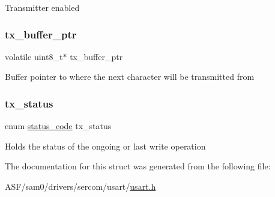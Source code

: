 Transmitter enabled \mbox{\label{structusart__module_ad4f5e977169e703291bab5e3483ff5dd}} 
\subsubsection{\texorpdfstring{tx\_buffer\_ptr}{tx\_buffer\_ptr}}
{\footnotesize\ttfamily volatile uint8\+\_\+t$\ast$ tx\+\_\+buffer\+\_\+ptr}

Buffer pointer to where the next character will be transmitted from \mbox{\label{structusart__module_af379c1d4517e118aa4b38c987c7f6d1e}} 
\subsubsection{\texorpdfstring{tx\_status}{tx\_status}}
{\footnotesize\ttfamily enum \mbox{\hyperlink{group__group__sam0__utils__status__codes_ga751c892e5a46b8e7d282085a5a5bf151}{status\+\_\+code}} tx\+\_\+status}

Holds the status of the ongoing or last write operation 

The documentation for this struct was generated from the following file\+:\begin{DoxyCompactItemize}
\item 
A\+S\+F/sam0/drivers/sercom/usart/\mbox{\hyperlink{usart_8h}{usart.\+h}}\end{DoxyCompactItemize}
